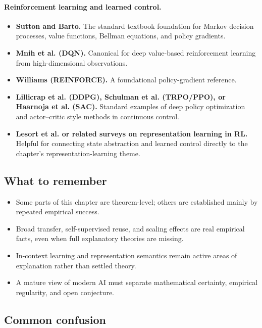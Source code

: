 \paragraph{Reinforcement learning and learned control.}
\begin{itemize}
    \item \textbf{Sutton and Barto.} The standard textbook foundation for Markov decision processes, value functions, Bellman equations, and policy gradients.
    \item \textbf{Mnih et al. (DQN).} Canonical for deep value-based reinforcement learning from high-dimensional observations.
    \item \textbf{Williams (REINFORCE).} A foundational policy-gradient reference.
    \item \textbf{Lillicrap et al. (DDPG), Schulman et al. (TRPO/PPO), or Haarnoja et al. (SAC).} Standard examples of deep policy optimization and actor--critic style methods in continuous control.
    \item \textbf{Lesort et al. or related surveys on representation learning in RL.} Helpful for connecting state abstraction and learned control directly to the chapter's representation-learning theme.
\end{itemize}

\subsection*{What to remember}

\begin{itemize}
    \item Some parts of this chapter are theorem-level; others are established mainly by repeated empirical success.
    \item Broad transfer, self-supervised reuse, and scaling effects are real empirical facts, even when full explanatory theories are missing.
    \item In-context learning and representation semantics remain active areas of explanation rather than settled theory.
    \item A mature view of modern AI must separate mathematical certainty, empirical regularity, and open conjecture.
\end{itemize}

\subsection*{Common confusion}

